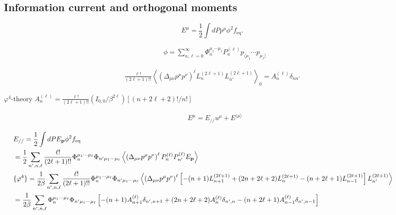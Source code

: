 \documentclass[aps,prd,preprint,nofootinbib,amsmath,amssymb,showpacs,longbibliography,singlecolumn,superscriptaddress,10pt]{revtex4-1}
\theoremstyle{plain}
\theoremstyle{definition}
\begin{document}
\subsection{Information current and orthogonal moments}


\begin{equation}
    E^{\mu} = \frac{1}{2} \int dP p^{\mu} \phi^2 f_{\mathrm{eq}} .
\end{equation}


\begin{equation}
\begin{aligned}
 &
 \phi = \sum_{n,\ell = 0}^{\infty} \Phi_{n}^{\mu_{1} \cdots \mu_{\ell}} P_{n}^{(\ell)} p_{\langle \mu_{1}} \cdots p_{ \mu_{\ell} \rangle}
\end{aligned}    
\end{equation}

\begin{equation}
\begin{aligned}
\frac{\ell!}{(2 \ell + 1)!!}\left\langle \left(\Delta_{\mu \nu} p^{\mu} p^{\nu}\right)^{\ell} L_{n}^{(2\ell +1)} L_{n'}^{(2\ell +1)} 
 \right\rangle_{0}
=
A_{n}^{(\ell)} \delta_{n n'}
\end{aligned}    
\end{equation}


$\varphi^{4}$-theory $A_{n}^{(\ell)} = \frac{\ell!}{(2 \ell + 1)!!} (I_{0,0}/\beta^{2\ell}) [(n+2\ell+2)!/n!]$ 

\begin{equation}
\begin{aligned}
&
E^{\mu} = E_{//} u^{\mu} + E^{\langle \mu \rangle}  
\end{aligned}    
\end{equation}

\begin{equation}
\hspace{-1cm}
\begin{aligned}
&
E_{//} = \frac{1}{2} \int dP E_{\bf p} \phi^2 f_{\mathrm{eq}}
\\
&
=
\frac{1}{2}
\sum_{n',n,\ell} \frac{\ell!}{(2\ell + 1)!!} \Phi_{n}^{\mu_{1} \cdots \mu_{\ell}} \Phi_{n' \mu_{1} \cdots \mu_{\ell}} \left\langle \left(\Delta_{\mu \nu} p^{\mu} p^{\nu}\right)^{\ell}P_{n}^{(\ell)} P_{n'}^{(\ell)} E_{\bf p} \right\rangle
\\
&
\{ \varphi^{4} \}=
\frac{1}{2 \beta}
\sum_{n',n,\ell} \frac{\ell!}{(2\ell + 1)!!} \Phi_{n}^{\mu_{1} \cdots \mu_{\ell}} \Phi_{n' \mu_{1} \cdots \mu_{\ell}} \left\langle \left(\Delta_{\mu \nu} p^{\mu} p^{\nu}\right)^{\ell} \left[-(n+1)L_{n+1}^{(2\ell+1)} + (2n+2\ell+2) L_{n}^{(2\ell+1)} - (n+ 2\ell +1) L_{n-1}^{(2\ell+1)} \right] L_{n'}^{(2\ell+1)}  \right\rangle
\\
&
=
\frac{1}{2 \beta}
\sum_{n',n,\ell} \Phi_{n}^{\mu_{1} \cdots \mu_{\ell}} \Phi_{n' \mu_{1} \cdots \mu_{\ell}} \left[-(n+1)A_{n+1}^{(\ell)}\delta_{n',n+1} + (2n+2\ell+2) A_{n}^{(\ell)}\delta_{n',n} - (n+ 2\ell +1) A_{n-1}^{(\ell)}\delta_{n',n-1}\right] \end{aligned}    
\end{equation}
\end{document}
